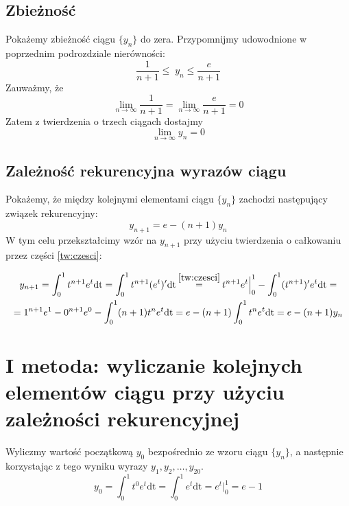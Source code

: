 \documentclass[11pt,wide]{article}
\newcommand\numeq[1]%
  {\stackrel{\scriptscriptstyle \mkern-1.5mu#1\mkern-1.5mu }{=}}
\begin{document}
\subsection{Zbieżność}
Pokażemy zbieżność ciągu \(\{y_n\}\) do zera.
Przypomnijmy udowodnione w poprzednim podrozdziale nierówności:
\begin{equation}
\frac{1}{n+1} \leq \; y_n \leq \frac{e}{n+1}
\end{equation}
Zauważmy, że 
\begin{equation}
\lim_{n\to \infty}\frac{1}{n+1} = \lim_{n\to \infty}\frac{e}{n+1} = 0
\end{equation}
Zatem z twierdzenia o trzech ciągach dostajmy 
\begin{equation}
\lim_{n\to \infty}y_n = 0
\end{equation}


\subsection{Zależność rekurencyjna wyrazów ciągu}
Pokażemy, że między kolejnymi elementami ciągu \(\{y_n\}\) zachodzi następujący związek rekurencyjny:
\begin{equation} \label{tw:zalrek}
y_{n+1} = e - (n+1)y_n
\end{equation}
W tym celu przekształcimy wzór na \(y_{n+1}\) przy użyciu twierdzenia o całkowaniu przez części \eqref{tw:czesci}:

\begin{multline}
y_{n+1} = \int_0^1 t^{n+1} e^t\mathrm{dt} =  \int_0^1 t^{n+1} (e^t)'\mathrm{dt}\numeq{\eqref{tw:czesci}} 
t^{n+1}e^t \Big|_{0}^{1} - \int_0^1 (t^{n+1})' e^t\mathrm{dt} = \\ = 1^{n+1}e^1 - 0^{n+1}e^0 - \int_0^1 (n+1)t^n e^t\mathrm{dt}
= e - (n+1)\int_0^1 t^n e^t\mathrm{dt} = e - (n+1)y_n
\end{multline}

\section{I metoda: wyliczanie kolejnych elementów ciągu przy użyciu zależności rekurencyjnej}
Wyliczmy wartość początkową \(y_0\) bezpośrednio ze wzoru ciągu \(\{y_n\}\), a następnie korzystając z tego wyniku wyrazy
\(y_1, y_2, \dots ,y_{20} \).
\begin{equation}
y_0 = \int_0^1 t^0 e^t\mathrm{dt} = \int_0^1 e^t\mathrm{dt} = e^t\Big|_{0}^{1} = e - 1
\end{equation}
\end{document}

